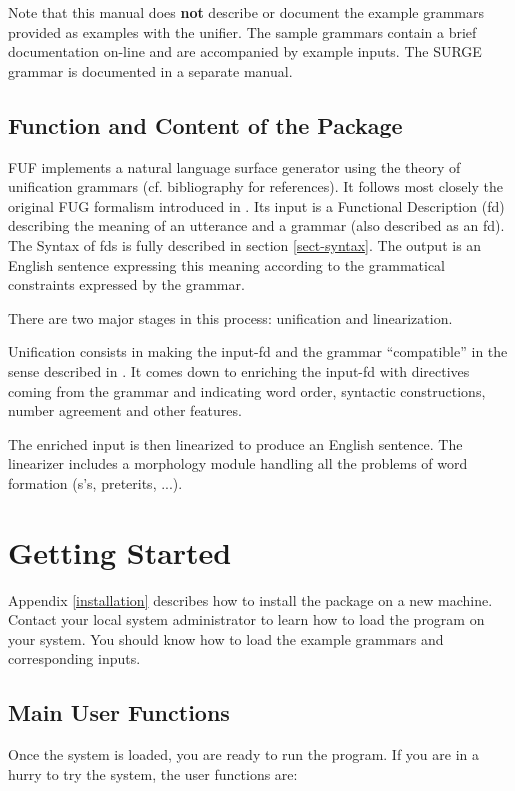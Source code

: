 \documentclass[10pt,a4paper]{report}
\begin{document}
Note that this manual does {\bf not} describe or document the example
grammars provided as examples with the unifier.  The sample grammars
contain a brief documentation on-line and are accompanied by example
inputs.  The SURGE grammar is documented in a separate manual.


\section{Function and Content of the Package}

FUF implements a natural language surface generator using the theory of 
unification grammars (cf. bibliography for references).  It follows most
closely the original FUG formalism introduced in \cite{Kay79}.
Its input is a Functional Description (fd) describing the meaning of an 
utterance and a grammar (also described as an fd).
The Syntax of fds is fully described in section \ref{sect-syntax}.
The output is an English sentence expressing this meaning according to the
grammatical constraints expressed by the grammar.

There are two major stages in this process: unification and linearization.
 

Unification consists in making the input-fd and the grammar ``compatible''
in the sense described in \cite{Kay79}. It comes down to enriching the input-fd
with directives coming from the grammar and indicating word order, syntactic
constructions, number agreement and other features.

The enriched input is then linearized to produce an English sentence.
The linearizer includes a morphology module handling all the problems
of word formation (s's, preterits, ...).


\chapter{Getting Started}

Appendix \ref{installation} describes how to install the package on a new
machine.  Contact your local system administrator to learn how to load the
program on your system.
You should know how to load the example grammars and corresponding inputs. 

\section{Main User Functions}

Once the system is loaded, you are ready to run the program.
If you are in a hurry to try the system, the user functions are:
\end{document}
